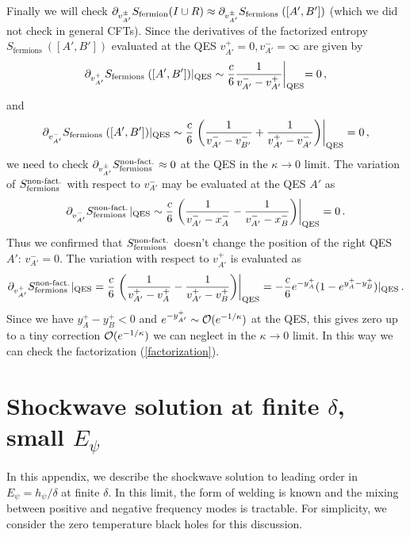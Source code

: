\documentclass[11pt,oneside,letterpaper]{article}
\newcommand{\p}{\partial}
\newcommand{\f}{\frac}
\newcommand{\ra}{\rangle}
\let\l=\lambda \let\m=\mu \let\n=\nu \let\x=\xi \let\p=\phi \let\r=v
\let\f=\frac
\def\ba{\begin{eqnarray}}
\def\ea{\end{eqnarray}}
\renewcommand{\p}{\partial}
\numberwithin{equation}{section}
\def\m{{\mu}}
\def\n{{\nu}}
\def\p{{\phi}}
\def\CO{{\cal O}}
\def\pp{\partial}
\def\ba{\begin{eqnarray}}
\def\ea{\end{eqnarray}}
\def\r{\rightarrow}
\def\f {\frac}
\def\l{\left}
\def\r{\right}
\def\ra{\rightarrow}
\def\x{\bar{x}}
\renewcommand{\p}{\partial}
\begin{document}
\begin{spacing}{1.1}
Finally we will check $\pp_{v^\pm_{A'}}S_{\rm fermion}(I\cup R)\approx\pp_{v^\pm_{A'}}S_{\text {fermions }}([A',B'])$ (which we did not check in general CFTs). Since the derivatives of the factorized entropy $S_{\text {fermions }}([A',B'])$  evaluated at the QES $v^+_{A'}=0, v^-_{A'}=\infty$ are given by
\ba
\pp_{v^+_{A'}} S_{\text {fermions }}([A',B'])|_{\rm QES}\sim \f{c}{6}\f{1}{v^-_{A'}-v^+_{A'}}\biggl|_{\rm QES}=0\, ,
\ea
and
\ba
\pp_{v^-_{A'}} S_{\text {fermions }}([A',B'])|_{\rm QES}\sim\f{c}{6}\l.\l(\f{1}{v^-_{A'}-v^-_{B'}}+\f{1}{v^+_{A'}-v^-_{A'}}\r)\r|_{\rm QES}=0\, ,\ea
 we need to check $\pp_{v^\pm_{A'}} S^{\rm non\mathchar`-fact.}_{\text {fermions }}\approx 0$ at the QES in the $\kappa \ra 0$ limit. The variation of $S^{\rm non\mathchar`-fact.}_{\text {fermions }}$ with respect to $v^-_{A'}$ may be evaluated at the QES $A'$ as
\ba
\pp_{v^-_{A'}} S^{\rm non\mathchar`-fact.}_{\text {fermions }}|_{\rm QES}\sim\f{c}{6}\l.\l(\f{1}{v^-_{A'}-x^-_A}-\f{1}{v^-_{A'}-x^-_B}\r)\r|_{\rm QES}=0\, .
\ea
Thus we confirmed that $S^{\rm non\mathchar`-fact.}_{\text {fermions }}$ doesn't change the position of the right QES $A'$: $v^-_{A'}=0$.
The variation with respect to $v^+_{A'}$ is evaluated as
\ba
\pp_{v^+_{A'}} S^{\rm non\mathchar`-fact.}_{\text {fermions }}|_{\rm QES}=\f{c}{6}\l.\l(\f{1}{v^+_{A'}-v^+_{A}}-\f{1}{v^+_{A'}-v^+_{B}}\r)\r|_{\rm QES}=-\f{c}{6}e^{-y^+_A}(1-e^{y^+_A-y^+_B})|_{\rm QES}\, .
\ea
Since we have $y^+_A-y^+_B<0$ and $e^{-y^+_{A'}}\sim\CO( e^{-1/\kappa})$ at the QES, this gives zero up to a tiny correction $\CO( e^{-1/\kappa})$ we can neglect in the $\kappa\ra 0$ limit. In this way we can check the factorization (\ref{factorization}).


\section{Shockwave solution at finite $\delta$, small $E_{\psi}$}\label{app:secorderdelta}




In this appendix, we describe the shockwave solution to leading order in $E_{\psi} = h_{\psi}/\delta$ at finite $\delta$. In this limit, the form of welding is known and the mixing between positive and negative frequency modes is tractable. For simplicity, we consider the zero temperature black holes for this discussion.



\end{spacing}
\end{document}
